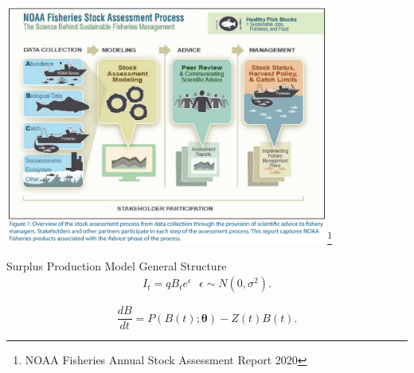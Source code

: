 \documentclass[ xcolor = pdftex, dvipsnames, table ]{beamer}
\begin{document}
%
\begin{frame}
	\centering
	\includegraphics[width=0.8\textwidth]{saCycle.png}\footnote{NOAA Fisheries Annual Stock Assessment Report 2020}
\end{frame}



%
\begin{frame}{Surplus Production Model General Structure}
        \begin{align*}
	I_t = q B_t e^\epsilon ~~~ \epsilon\sim N(0, \sigma^2). \label{resp}
	\end{align*}
	
	\begin{equation*}
	\frac{dB}{dt} = P(B(t); \bm{\theta}) - Z(t)B(t). \label{ode}
	\end{equation*}
\end{frame}
\end{document}
